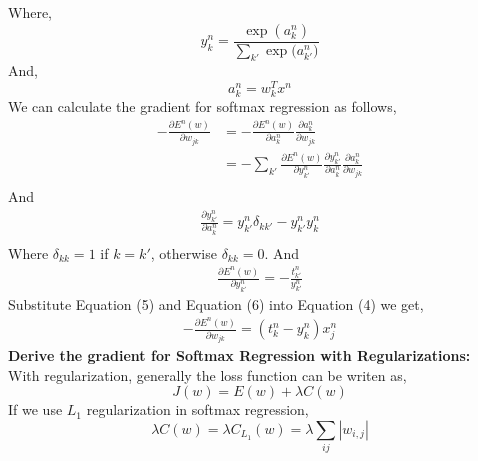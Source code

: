 \documentclass{article} %
\begin{document}
Where, 
\begin{equation}
	y_k^n = \frac{\exp{(a_k^n)}}{ \sum_{k'}\exp{(a_{k'}^n})}
\end{equation}
And, 
\begin{equation}
	a_k^n = w_k^Tx^n
\end{equation}
We can calculate the gradient for softmax regression as follows,
\begin{equation}
\begin{split}
-\frac{\partial E^n(w)}{\partial w_{jk}}& = - \frac{\partial E^n(w)}{\partial a_k^n}\frac{\partial a_k^n}{\partial w_{jk}} \\
& = -\sum_{k'} \frac{\partial E^n(w)}{\partial y^n_{k'}} \frac{\partial y^n_{k'}}{\partial a^n_k}\frac{\partial a_k^n}{\partial w_{jk}} \\
\end{split}
\end{equation}
And 
\begin{equation}
\begin{split}
\frac{\partial y^n_{k'}}{\partial a^n_k} =  y^n_{k'}\delta_{kk'} - y^n_{k
'}y^n_{k}\\
\end{split}
\end{equation}
Where $\delta_{kk} = 1$ if $k = k'$, otherwise $\delta_{kk} = 0$.
And
\begin{equation}
\begin{split}
	\frac{\partial E^n(w)}{\partial y^n_{k'}} = -\frac{t^n_{k'}}{y^n_{k'}}
\end{split}
\end{equation}
Substitute Equation (5) and Equation (6) into Equation (4) we get,
\begin{equation}
\begin{split}
	-\frac{\partial E^n(w)}{\partial w_{jk}} = (t^n_k - y^n_k)x_j^n 
\end{split}
\end{equation}
\textbf{Derive the gradient for Softmax Regression with Regularizations:} \\

With regularization, generally the loss function can be writen as,
\begin{equation}
J(w) = E(w) + \lambda C(w)
\end{equation}
If we use $L_1$ regularization in softmax regression,
\begin{equation}
	\lambda C(w) = \lambda C_{L_1}(w) =   \lambda \sum_{ij}|w_{i,j}|
\end{equation}
\end{document}
